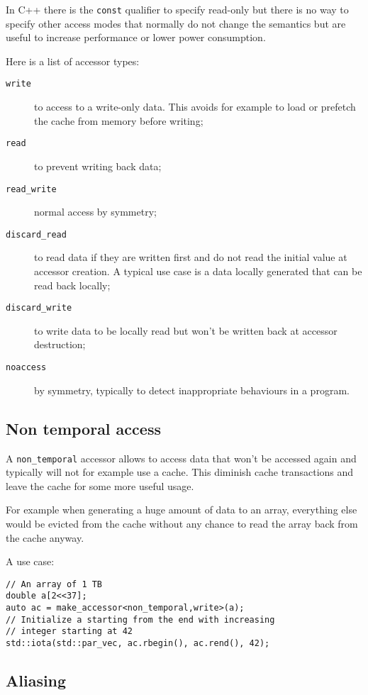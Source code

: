 \documentclass[a4paper]{article}
\begin{document}
In C++ there is the \lstinline|const| qualifier to specify read-only
but there is no way to specify other access modes that normally do not
change the semantics but are useful to increase performance or lower
power consumption.

Here is a list of accessor types:
\begin{description}
\item[\texttt{write}] to access to a write-only data. This avoids for
  example to load or prefetch the cache from memory before writing;
\item[\texttt{read}] to prevent writing back data;
\item[\texttt{read\_write}] normal access by symmetry;
\item[\texttt{discard\_read}] to read data if they are written first
  and do not read the initial value at accessor creation. A typical
  use case is a data locally generated that can be read back locally;
\item[\texttt{discard\_write}] to write data to be locally read but
  won't be written back at accessor destruction;
\item[\texttt{noaccess}] by symmetry, typically to detect
  inappropriate behaviours in a program.
\end{description}


\subsection{Non temporal access}
\label{sec:non-temporal-access}

A \lstinline|non_temporal| accessor allows to access data that won't
be accessed again and typically will not for example use a cache. This
diminish cache transactions and leave the cache for some more useful
usage.

For example when generating a huge amount of data to an array, everything else
would be evicted from the cache without any chance to read the array
back from the cache anyway.

A use case:
\begin{lstlisting}
// An array of 1 TB
double a[2<<37];
auto ac = make_accessor<non_temporal,write>(a);
// Initialize a starting from the end with increasing
// integer starting at 42
std::iota(std::par_vec, ac.rbegin(), ac.rend(), 42);
\end{lstlisting}%


\subsection{Aliasing}
\label{sec:aliasing}
\end{document}

